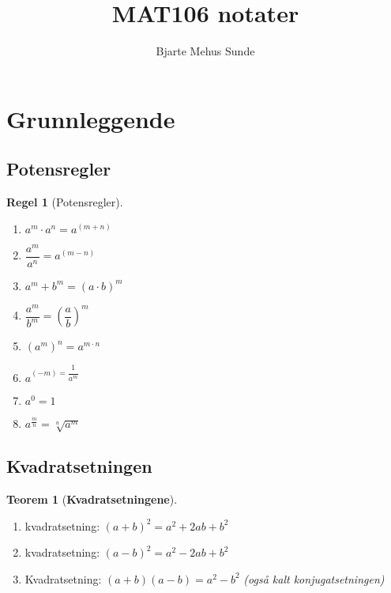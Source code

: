 \documentclass[11pt]{article}
\author{Bjarte Mehus Sunde}
\theoremstyle{definition}
\theoremstyle{definition}
\theoremstyle{definition}
\theoremstyle{definition}
\newtheorem{teo}{Teorem}[section]
\newenvironment{fteo}
{\begin{mdframed}[style=minstil]\begin{teo}}
		{\end{teo}\end{mdframed}}
\theoremstyle{definition}
\newtheorem{regel}{Regel}
\newenvironment{fregel}
{\begin{mdframed}[style=minstil]\begin{regel}}
		{\end{regel}\end{mdframed}}
\theoremstyle{definition}
\begin{document}
	
    \title{MAT106 notater}
    \maketitle
    	
	\newpage
	
	\tableofcontents
	
	\newpage

	\section{Grunnleggende}
	
	\subsection{Potensregler}
	
	\begin{fregel}[Potensregler] \leavevmode
	\begin{enumerate}
		\item \(a^m\cdot a^n  = a^{(m+n)} \)
		\item \(\dfrac{a^m}{a^n}=a^{(m-n)} \)
		\item \(a^m + b^m = (a\cdot b)^m \)
		\item \(\dfrac{a^m}{b^m}=\left( \dfrac{a}{b}\right)^m  \)
		\item \((a^m)^n=a^{m\cdot n} \)
		\item \(a^{(-m)=\dfrac{1}{a^m}} \)
		\item \(a^0=1 \)
		\item \(a^{\frac{m}{n}}=\sqrt[n]{a^m}\)
	\end{enumerate}
	\end{fregel}
	
	
	\subsection{Kvadratsetningen}
	
	\begin{fteo}[\textbf{Kvadratsetningene}] \leavevmode
	\begin{enumerate}	
	    \item kvadratsetning: \( (a+b)^2 = a^2+2ab+b^2 \)
		\item kvadratsetning: \((a-b)^2=a^2-2ab+b^2 \)
		\item Kvadratsetning: \((a+b)(a-b)=a^2-b^2\)  \textit{(også kalt konjugatsetningen)}
	\end{enumerate}	
	\end{fteo}
	
\end{document}
